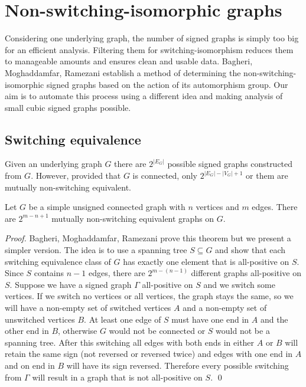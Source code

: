 \chapter{Non-switching-isomorphic graphs}

Considering one underlying graph, the number of signed graphs is simply too big for an efficient analysis. Filtering them for switching-isomorphism reduces them to manageable amounts and ensures clean and usable data. Bagheri, Moghaddamfar, Ramezani\cite{switching-isomorphic} establish a method of determining the non-switching-isomorphic signed graphs based on the action of its automorphism group. Our aim is to automate this process using a different idea and making analysis of small cubic signed graphs possible.

\section{Switching equivalence}

Given an underlying graph $G$ there are $2^{|E_G|}$ possible signed graphs constructed from $G$. However, provided that $G$ is connected, only $2^{|E_G| - |V_G| + 1}$ or them are mutually non-switching equivalent.

\begin{theorem}\label{lem1:eq-classes}
    Let $G$ be a simple unsigned connected graph with $n$ vertices and $m$ edges. There are $2^{m - n + 1}$ mutually non-switching equivalent graphs on $G$.
\end{theorem}

\textit{Proof.} Bagheri, Moghaddamfar, Ramezani\cite{switching-isomorphic} prove this theorem but we present a simpler version. The idea is to use a spanning tree $S \subseteq G$ and show that each switching equivalence class of $G$ has exactly one element that is all-positive on $S$. Since $S$ contains $n - 1$ edges, there are $2^{m - (n - 1)}$ different graphs all-positive on $S$. Suppose we have a signed graph $\Gamma$ all-positive on $S$ and we switch some vertices. If we switch no vertices or all vertices, the graph stays the same, so we will have a non-empty set of switched vertices $A$ and a non-empty set of unswitched vertices $B$. At least one edge of $S$ must have one end in $A$ and the other end in $B$, otherwise $G$ would not be connected or $S$ would not be a spanning tree. After this switching all edges with both ends in either $A$ or $B$ will retain the same sign (not reversed or reversed twice) and edges with one end in $A$ and on end in $B$ will have its sign reversed. Therefore every possible switching from $\Gamma$ will result in a graph that is not all-positive on $S$. \qed

